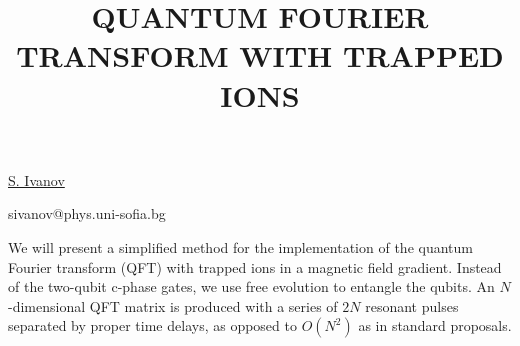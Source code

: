 \title{QUANTUM FOURIER TRANSFORM WITH TRAPPED IONS}

\underline{S. Ivanov}

{\normalsize{
\vspace{-4mm} \unisofia


\email sivanov@phys.uni-sofia.bg}}

We will present a simplified method for the implementation of the quantum Fourier transform (QFT) with trapped ions in a magnetic field gradient. Instead of the two-qubit c-phase gates, we use free evolution to entangle the qubits. An $N$-dimensional QFT matrix is produced with a series of $2N$ resonant pulses separated by proper time delays, as opposed to $O(N^2)$ as in standard proposals.

\vspace{\baselineskip}
